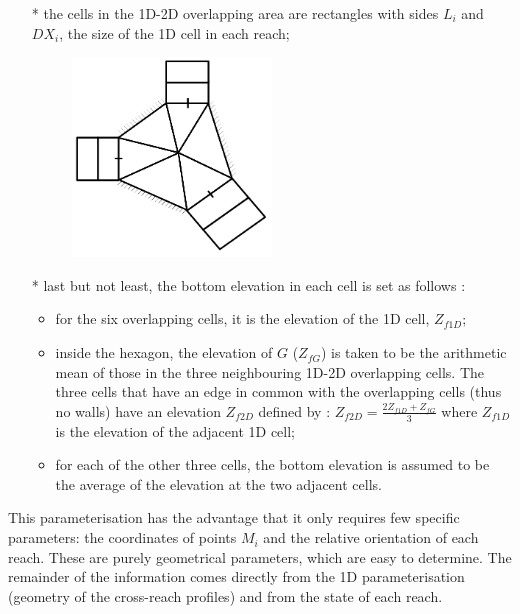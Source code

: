 \begin{itemize}
 \item[*] the cells in the 1D-2D overlapping area are rectangles with sides $L_i$ and $DX_i$, the size of the 1D cell in each reach;
  \begin{figure}[H]
    \begin{center}
     \includegraphics[width=0.5\textwidth]{Figures/cr5.png}
    \end{center}
  \end{figure}

 \item[*] last but not least, the bottom elevation in each cell is set as follows :
   \begin{itemize}
     \item for the six overlapping cells, it is the elevation of the 1D cell, $Z_{f1D}$;
     \item inside the hexagon, the elevation of $G$ ($Z_{fG}$) is taken to be the arithmetic mean of those in the three neighbouring 1D-2D overlapping cells. The three cells that have an edge in common with the overlapping cells (thus no walls) have an elevation $Z_{f2D}$ defined by : $Z_{f2D} = \frac{2Z_{f1D}+Z_{fG}}{3}$ where $Z_{f1D}$ is the elevation of the adjacent 1D cell;
     \item for each of the other three cells, the bottom elevation is assumed to be the average of the elevation at the two adjacent cells.
   \end{itemize}
\end{itemize}

This parameterisation has the advantage that it only requires few specific parameters: the coordinates of points $M_i$ and the relative orientation of each reach. These are purely geometrical parameters, which are easy to determine. The remainder of the information comes directly from the 1D parameterisation (geometry of the cross-reach profiles) and from the state of each reach.

